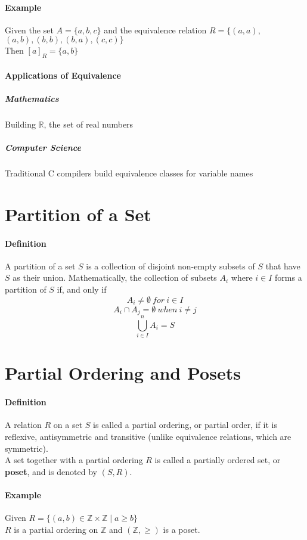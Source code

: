 \documentclass[10pt,a4paper]{book}
\begin{document}
\paragraph*{Example}
Given the set $A = \{a,b,c\}$ and the equivalence relation $R = \{(a,a),$\\$(a,b),(b,b),(b,a),(c,c)\}$\\
Then $[a]_R = \{a,b\}$
\paragraph*{Applications of Equivalence}
\subparagraph*{Mathematics}
Building $\mathbb{R}$, the set of real numbers
\subparagraph*{Computer Science}
Traditional C compilers build equivalence classes for variable names

\section{Partition of a Set}
\paragraph*{Definition}
$\ $\\
\hspace*{\parindent}A partition of a set $S$ is a collection of disjoint non-empty subsets of $S$ that have $S$ as their union. Mathematically, the collection of subsets $A_i$ where $i \in I$ forms a partition of $S$ if, and only if 
\[A_{i} \neq \emptyset \ for \  i \in I\]
\[A_{i} \cap A_j = \emptyset \  when \ i \neq j\]
\[\bigcup_{i \in I}^{n} A_{i} = S\]

\section{Partial Ordering and Posets}
\paragraph*{Definition}
A relation $R$ on a set $S$ is called a partial ordering, or partial order, if it is reflexive, antisymmetric and transitive (unlike equivalence relations, which are symmetric).\\
A set together with a partial ordering $R$ is called a partially ordered set, or \textbf{poset}, and is denoted by $(S,R)$.
\paragraph*{Example}
Given $R = \{(a,b) \in \mathbb{Z} \times \mathbb{Z} \mid a \geqslant b \}$\\
$R$ is a partial ordering on $\mathbb{Z}$ and $(\mathbb{Z}, \geqslant)$ is a poset.
\end{document}
